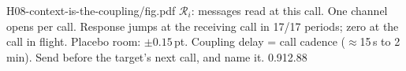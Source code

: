 {H08-context-is-the-coupling/fig.pdf}
{$\mathcal R_i$: messages read at this call. One channel opens per call.}
{Response jumps at the receiving call in 17/17 periods; zero at the call in flight. Placebo room: $\pm0.15$\,pt.}
{Coupling delay = call cadence ($\approx$15\,s to 2\,min). Send before the target's next call, and name it.}
{0.91}{2.88}
